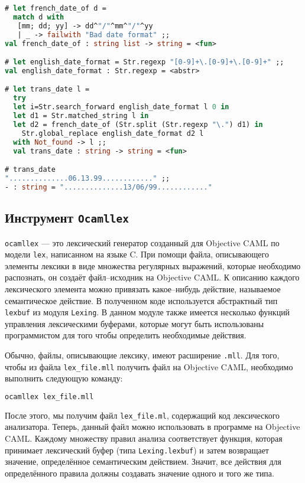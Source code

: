 \begin{lstlisting}[language=OCaml]
# let french_date_of d =
  match d with
   [mm; dd; yy] -> dd^"/"^mm^"/"^yy
   | _ -> failwith "Bad date format" ;;
val french_date_of : string list -> string = <fun>

# let english_date_format = Str.regexp "[0-9]+\.[0-9]+\.[0-9]+" ;;
val english_date_format : Str.regexp = <abstr>

# let trans_date l =
  try
  let i=Str.search_forward english_date_format l 0 in
  let d1 = Str.matched_string l in
  let d2 = french_date_of (Str.split (Str.regexp "\.") d1) in
    Str.global_replace english_date_format d2 l
  with Not_found -> l ;;
  val trans_date : string -> string = <fun>

# trans_date
"..............06.13.99............" ;;
- : string = "..............13/06/99............"
\end{lstlisting}

\subsection{Инструмент \texttt{Ocamllex}}

\texttt{ocamllex} --- это лексический генератор созданный для Objective CAML по
модели \texttt{lex}, написанном на языке C. При помощи файла, описывающего
элементы лексики в виде множества регулярных выражений, которые необходимо
распознать, он создаёт файл--исходник на Objective CAML. К описанию каждого
лексического элемента можно привязать какое--нибудь действие, называемое
семантическое действие. В полученном коде используется абстрактный тип
\texttt{lexbuf} из модуля \texttt{Lexing}. В данном модуле также имеется
несколько функций управления лексическими буферами, которые могут быть
использованы программистом для того чтобы определить необходимые действия.

Обычно, файлы, описывающие лексику, имеют расширение \texttt{.mll}. Для того,
чтобы из файла \texttt{lex\_file.mll} получить файл на Objective CAML,
необходимо выполнить следующую команду:

\begin{lstlisting}[language=OCaml]
ocamllex lex_file.mll
\end{lstlisting}

После этого, мы получим файл \texttt{lex\_file.ml}, содержащий код лексического
анализатора. Теперь, данный файл можно использовать в программе на Objective
CAML. Каждому множеству правил анализа соответствует функция, которая принимает
лексический буфер (типа \texttt{Lexing.lexbuf}) и затем возвращает значение,
определённое семантическим действием. Значит, все действия для определённого
правила должны создавать значение одного и того же типа.

